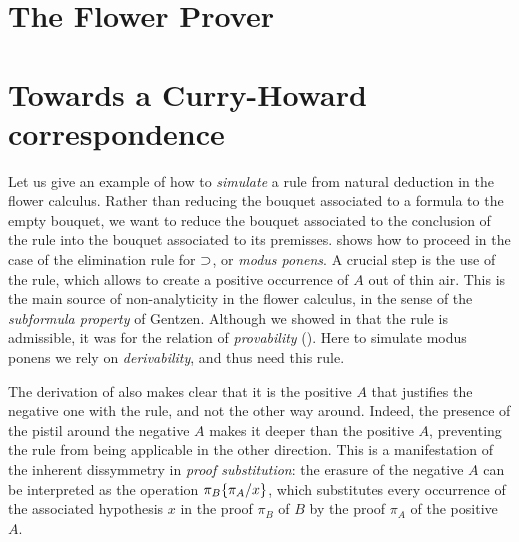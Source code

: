 \section{The Flower Prover}



\section{Towards a Curry-Howard correspondence}



Let us give an example of how to \emph{simulate} a rule from natural deduction
in the flower calculus. Rather than reducing the bouquet associated to a formula
to the empty bouquet, we want to reduce the bouquet associated to the conclusion
of the rule into the bouquet associated to its premisses. 
shows how to proceed in the case of the elimination rule for $\supset$, or
\emph{modus ponens}. A crucial step is the use of the  rule, which
allows to create a positive occurrence of $A$ out of thin air. This is the main
source of non-analyticity in the flower calculus, in the sense of the
\emph{subformula property} of Gentzen. Although we showed in
 that the  rule is admissible, it was for the
relation of \emph{provability} (). Here to simulate modus
ponens we rely on \emph{derivability}, and thus need this rule.

The derivation of  also makes clear that it is the positive
$A$ that justifies the negative one with the  rule, and not
the other way around. Indeed, the presence of the pistil around the negative $A$
makes it deeper than the positive $A$, preventing the  rule
from being applicable in the other direction. This is a manifestation of the
inherent dissymmetry in \emph{proof substitution}: the erasure of the negative
$A$ can be interpreted as the operation $\pi_B \{ \pi_A / x \}$, which
substitutes every occurrence of the associated hypothesis $x$ in the proof
$\pi_B$ of $B$ by the proof $\pi_A$ of the positive $A$.

